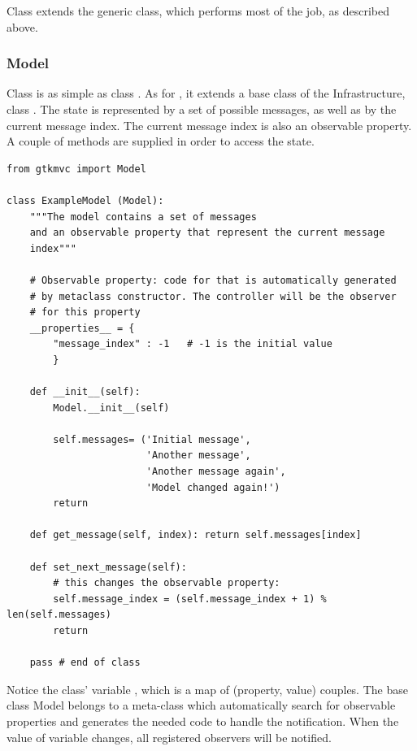 Class  extends the generic 
class, which performs most of the job, as described above.


\subsubsection{Model}
Class  is as simple as class
.  As for , it extends a
base class of the \mvco Infrastructure, class .  The
state is represented by a set of possible messages, as well as by the
current message index. The current message index is also an
observable property. A couple of methods are supplied in order to
access the state.

{ \codesize 
\begin{verbatim} 
from gtkmvc import Model

class ExampleModel (Model):
    """The model contains a set of messages
    and an observable property that represent the current message
    index"""

    # Observable property: code for that is automatically generated
    # by metaclass constructor. The controller will be the observer
    # for this property
    __properties__ = {
        "message_index" : -1   # -1 is the initial value
        }

    def __init__(self):
        Model.__init__(self)

        self.messages= ('Initial message',
                        'Another message', 
                        'Another message again',
                        'Model changed again!')
        return

    def get_message(self, index): return self.messages[index]

    def set_next_message(self):
        # this changes the observable property:
        self.message_index = (self.message_index + 1) % len(self.messages)
        return

    pass # end of class

\end{verbatim}
}

Notice the class' variable , which is a
map of (property, value) couples. The base class Model belongs to a
meta-class which automatically search for observable properties and
generates the needed code to handle the notification.  When the value
of variable  changes, all registered
observers will be notified.


